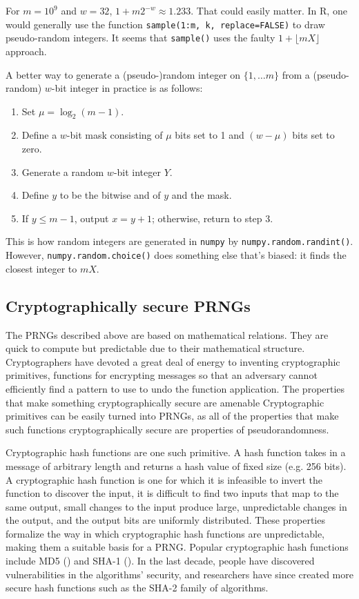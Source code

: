 \documentclass[12pt]{article}
\newcommand{\todo}[1]{{\color{red}{TO DO: \sc #1}}}
\begin{document}
For $m = 10^9$ and $w=32$, $1 + m 2^{-w} \approx 1.233$. That could easily matter.
In R, one would generally use the function \texttt{sample(1:m, k, replace=FALSE)} to draw pseudo-random integers. 
It seems that \texttt{sample()} uses the faulty $1 + \lfloor mX\rfloor$ approach.
\todo{illustrate with a figure}

A better way to generate a (pseudo-)random integer on $\{1, \ldots m\}$ from a (pseudo-random) $w$-bit integer in practice is as follows:
\begin{enumerate}
\item Set $\mu = \log_2(m-1)$.
\item Define a $w$-bit mask consisting of $\mu$ bits set to 1 and $(w-\mu)$ bits set to zero.
\item Generate a random $w$-bit integer $Y$.
\item Define $y$ to be the bitwise and of $y$ and the mask.
\item If $y \le m-1$, output $x = y+1$; otherwise, return to step 3.
\end{enumerate}
This is how random integers are generated in \texttt{numpy} by \texttt{numpy.random.randint()}. 
However, \texttt{numpy.random.choice()} does something else that's biased: it finds the closest integer to $mX$.

\subsection{Cryptographically secure PRNGs}

The PRNGs described above are based on mathematical relations.
They are quick to compute but predictable due to their mathematical structure.
Cryptographers have devoted a great deal of energy to inventing cryptographic primitives,
functions for encrypting messages so that an adversary cannot efficiently find a pattern to use to undo the function application.
The properties that make something cryptographically secure are amenable
Cryptographic primitives can be easily turned into PRNGs, as all of the properties that make such functions cryptographically secure
are properties of pseudorandomness.

Cryptographic hash functions are one such primitive.
A hash function takes in a message of arbitrary length and returns a hash value of fixed size (e.g. 256 bits).
A cryptographic hash function is one for which it is infeasible to invert the function to discover the input,
 it is difficult to find two inputs that map to the same output,
 small changes to the input produce large, unpredictable changes in the output,
 and the output bits are uniformly distributed.
These properties formalize the way in which cryptographic hash functions are unpredictable, making them a suitable basis for a PRNG.
Popular cryptographic hash functions include MD5 (\cite{rivest_md5_1992}) and SHA-1 (\cite{eastlake_us_2001}).
In the last decade, people have discovered vulnerabilities in the algorithms' security, and researchers have since created more secure hash functions such as the SHA-2 family of algorithms.
\end{document}
